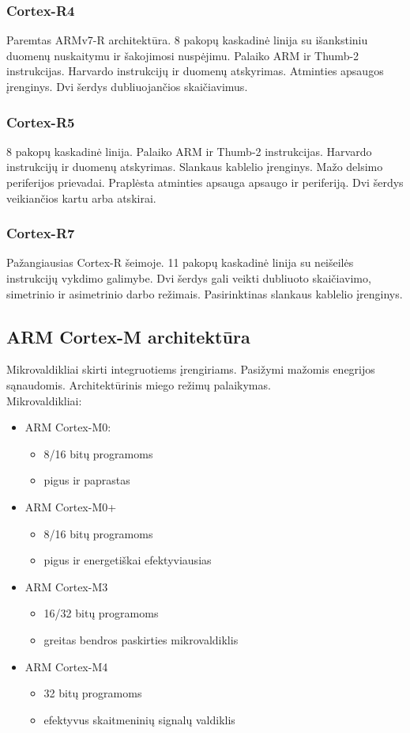 \documentclass[a4paper, 12pt]{article} %
\begin{document}
\begin{onehalfspacing}
\subsubsection{Cortex-R4}
Paremtas ARMv7-R architekt\={u}ra. 8 pakop\k{u} kaskadin\.{e} linija su i\v{s}ankstiniu duomen\k{u} nuskaitymu ir \v{s}akojimosi nusp\.{e}jimu. Palaiko ARM ir Thumb-2 instrukcijas. Harvardo instrukcij\k{u} ir duomen\k{u} atskyrimas. Atminties apsaugos \k{i}renginys. Dvi \v{s}erdys dubliuojan\v{c}ios skai\v{c}iavimus.  
\subsubsection{Cortex-R5}
8 pakop\k{u} kaskadin\.{e} linija. Palaiko ARM ir Thumb-2 instrukcijas. Harvardo instrukcij\k{u} ir duomen\k{u} atskyrimas. Slankaus kablelio \k{i}renginys. Ma\v{z}o delsimo periferijos prievadai. Prapl\.{e}sta atminties apsauga apsaugo ir periferij\k{a}. Dvi \v{s}erdys veikian\v{c}ios kartu arba atskirai.
\subsubsection{Cortex-R7}
Pa\v{z}angiausias Cortex-R \v{s}eimoje. 11 pakop\k{u} kaskadin\.{e} linija su nei\v{s}eil\.{e}s instrukcij\k{u} vykdimo galimybe. Dvi \v{s}erdys gali veikti dubliuoto skai\v{c}iavimo, simetrinio ir asimetrinio darbo re\v{z}imais. Pasirinktinas slankaus kablelio \k{i}renginys.  

\subsection{ARM Cortex-M architekt\={u}ra}
Mikrovaldikliai skirti integruotiems \k{i}rengiriams. Pasi\v{z}ymi ma\v{z}omis enegrijos s\k{a}naudomis. Architekt\={u}rinis miego re\v{z}im\k{u} palaikymas. \\
Mikrovaldikliai:
\begin{itemize}
\item ARM Cortex-M0:
\begin{itemize}
\item 8/16 bit\k{u} programoms
\item pigus ir paprastas
\end{itemize}
\item ARM Cortex-M0+
\begin{itemize}
\item 8/16 bit\k{u} programoms
\item pigus ir energeti\v{s}kai efektyviausias
\end{itemize}
\item ARM Cortex-M3
\begin{itemize}
\item 16/32 bit\k{u} programoms
\item greitas bendros paskirties mikrovaldiklis
\end{itemize}
\item ARM Cortex-M4
\begin{itemize}
\item 32 bit\k{u} programoms
\item efektyvus skaitmenini\k{u} signal\k{u} valdiklis
\end{itemize}


\end{itemize}
\end{onehalfspacing}
\end{document}
